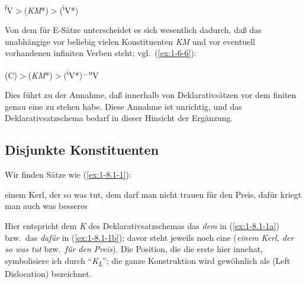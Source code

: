 \documentclass[output=paper]{langsci/langscibook}
\begin{document}
\begin{exe}
\exi{(\ref{ex:1-4-3})}
\textsuperscript{f}V$>$(\textit{KM}*)$>$(\textsuperscript{i}V*)
\end{exe}
Von dem  für E-Sätze unterscheidet es sich wesentlich dadurch, daß das unabhängige  vor beliebig vielen Konstituenten \textit{KM} und vor eventuell vorhandenen infiniten Verben steht; vgl.\ (\ref{ex:1-6-6}):

\begin{exe}
\exi{(\ref{ex:1-6-6})}
(C)$>$(\textit{KM}*)$>$(\textsuperscript{i}V*)$^{\smallfrown}$\textsuperscript{u}V
\end{exe}
Dies führt zu der Annahme, daß innerhalb von Deklarativsätzen vor dem finiten
 genau eine  zu stehen habe. Diese Annahme ist unrichtig, und das
Deklarativsatzschema bedarf in dieser Hinsicht der Ergänzung.

\subsection{Disjunkte Konstituenten}%
\label{subsec:1-8.1}

Wir finden Sätze wie (\ref{ex:1-8.1-1}):
\begin{exe}
\ex\label{ex:1-8.1-1} 
\begin{xlist}
\ex\label{ex:1-8.1-1a} einem Kerl, der so was tut, dem darf man nicht trauen
\ex\label{ex:1-8.1-1b} für den Preis, dafür kriegt man auch was besseres
\end{xlist}
\end{exe}
Hier entspricht dem \textit{K} des Deklarativsatzschemas das \textit{dem} in (\ref{ex:1-8.1-1a}) bzw.\ das \textit{dafür} in (\ref{ex:1-8.1-1b}); davor steht jeweils noch eine  (\textit{einem Kerl, der so was tut} bzw.\ \textit{für den Preis}). Die Position, die die erste  hier innehat, symbolisiere
ich durch "`\textit{K\textsubscript{L}}"'; die ganze Konstruktion wird gewöhnlich als  (Left Dislocation) bezeichnet.
\end{document}
